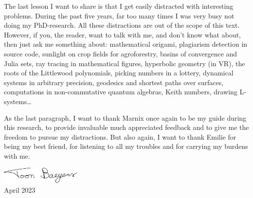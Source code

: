 The last lesson I want to share is that I get easily distracted with interesting problems. During the past five years, far too many times I was very busy not doing my PhD-research. All these distractions are out of the scope of this text. However, if you, the reader, want to talk with me, and don't know what about, then just ask me something about:
mathematical origami,
plagiarism detection in source code,
sunlight on crop fields for agroforestry,
basins of convergence and Julia sets,
ray tracing in mathematical figures,
hyperbolic geometry (in VR),
the roots of the Littlewood polynomials,
picking numbers in a lottery,
dynamical systems in arbitrary precision,
geodesics and shortest paths over surfaces,
computations in non-commutative quantum algebras,
Keith numbers,
drawing L-systems\dots

As the last paragraph, I want to thank Marnix once again to be my guide during this research, to provide invaluable much appreciated feedback and to give me the freedom to pursue my distractions. But also again, I want to thank Emilie for being my best friend, for listening to all my troubles and for carrying my burdens with me.

\vspace{1cm}

\begin{flushright}
    \includegraphics[width=4cm]{img/signature.pdf}\\
    April 2023
\end{flushright}

\stopchapter
